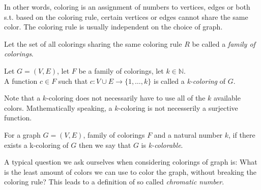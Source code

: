 
In other words, coloring is an assignment of numbers to vertices, edges or both s.t. based on the coloring rule, certain vertices or edges cannot share the same color. The coloring rule is usually independent on the choice of graph.

\begin{definition}
    Let the set of all colorings sharing the same coloring rule $R$ be called a \textit{family of colorings}.
\end{definition}

\begin{definition}
    Let $G=(V,E)$, let $F$ be a family of colorings, let $k \in \mathbb{N}$. \\ A function $c \in F$ such that $c: V \cup E \rightarrow \{1,\ldots,k\}$ is called a \textit{k-coloring} of $G$.
\end{definition}

Note that a $k$-coloring does not necessarily have to use all of the $k$ available colors. Mathematically speaking, a $k$-coloring is not necesserily a surjective function.

\begin{definition}
    For a graph $G=(V,E)$, family of colorings $F$ and a natural number $k$, if there exists a k-coloring of $G$ then we say that $G$ is \textit{k-colorable}.
\end{definition}

    A typical question we ask ourselves when considering colorings of graph is: What is the least amount of colors we can use to color the graph, without breaking the coloring rule? This leads to a definition of so called \textit{chromatic number}. 

